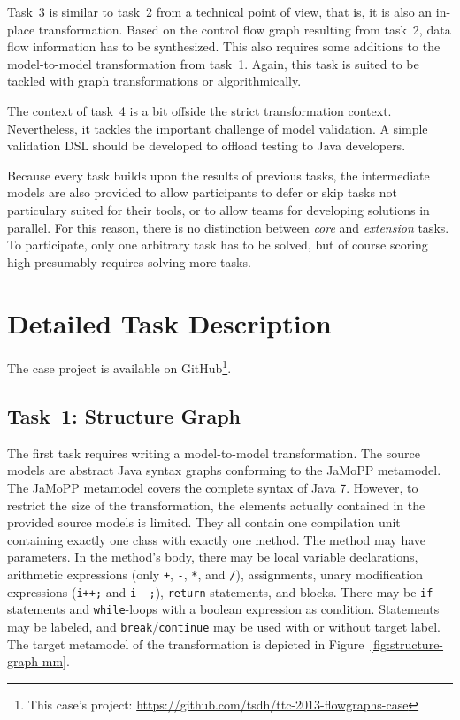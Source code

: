 \documentclass[submission]{eptcs}
\begin{document}
Task~3 is similar to task~2 from a technical point of view, that is, it is also
an in-place transformation.  Based on the control flow graph resulting from
task~2, data flow information has to be synthesized.  This also requires some
additions to the model-to-model transformation from task~1.  Again, this task
is suited to be tackled with graph transformations or algorithmically.

The context of task~4 is a bit offside the strict transformation context.
Nevertheless, it tackles the important challenge of model validation.  A simple
validation DSL should be developed to offload testing to Java developers.

Because every task builds upon the results of previous tasks, the intermediate
models are also provided to allow participants to defer or skip tasks not
particulary suited for their tools, or to allow teams for developing solutions
in parallel.  For this reason, there is no distinction between \emph{core} and
\emph{extension} tasks.  To participate, only one arbitrary task has to be
solved, but of course scoring high presumably requires solving more tasks.


\section{Detailed Task Description}
\label{sec:task-descr}

The case project is available on GitHub\footnote{This case's project:
  \url{https://github.com/tsdh/ttc-2013-flowgraphs-case}}.

\subsection{Task~1: Structure Graph}
\label{sec:task1-structure-graph}

The first task requires writing a model-to-model transformation.  The source
models are abstract Java syntax graphs conforming to the JaMoPP metamodel.  The
JaMoPP metamodel covers the complete syntax of Java 7.  However, to restrict
the size of the transformation, the elements actually contained in the provided
source models is limited.  They all contain one compilation unit containing
exactly one class with exactly one method.  The method may have parameters.  In
the method's body, there may be local variable declarations, arithmetic
expressions (only \verb|+|, \verb|-|, \verb|*|, and \verb|/|), assignments,
unary modification expressions (\verb|i++;| and \verb|i--;|), \verb|return|
statements, and blocks.  There may be \verb|if|-statements and
\verb|while|-loops with a boolean expression as condition.  Statements may be
labeled, and \verb|break|/\verb|continue| may be used with or without target
label.  The target metamodel of the transformation is depicted in
Figure~\ref{fig:structure-graph-mm}.
\end{document}

